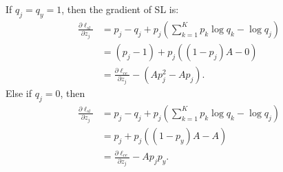 \documentclass[10pt,twocolumn,letterpaper]{article}
\begin{document}
If $q_{j} = q_y = 1$, then the gradient of SL is:
\begin{equation}
\label{y_1}
\begin{split}
    \frac{\partial \ell_{sl}}{\partial z_j} & = p_j - q_j + p_j(\sum_{k=1}^K p_k \log q_k - \log q_j) \\
    & = (p_j - 1) + p_j((1-p_j)A -0) \\
    & = \frac{\partial \ell_{ce}}{\partial z_j} - (A p_j^2 - Ap_j).
\end{split}
\end{equation}
Else if $q_j = 0$, then
\begin{equation}
\label{y_0}
\begin{aligned}
    \frac{\partial \ell_{sl}}{\partial z_j} & = p_j - q_j + p_j(\sum_{k=1}^K p_k \log q_k - \log q_j) \\
    & = p_j + p_j((1-p_y)A - A) \\
    & = \frac{\partial \ell_{ce}}{\partial z_j} - A p_jp_y.
\end{aligned}
\end{equation}
\end{document}
